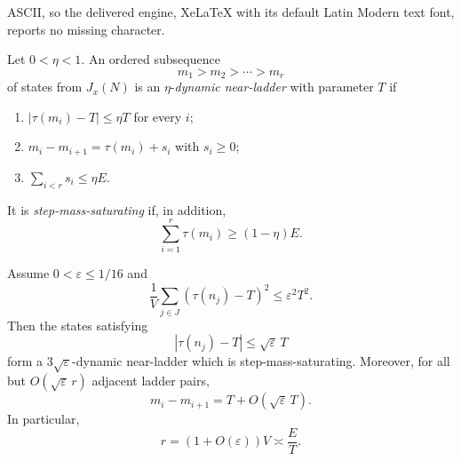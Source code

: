 \documentclass[10pt,a4paper]{amsart}
\begin{document}
ASCII, so the delivered engine, XeLaTeX with its default Latin Modern text font, reports no missing character.
\begin{definition}\label{def:dynamic-ladder}
Let $0<\eta<1$.  An ordered subsequence
\[
 m_1>m_2>\cdots>m_r
\]
of states from $J_x(N)$ is an $\eta$-\emph{dynamic near-ladder} with
parameter $T$ if
\begin{enumerate}[label=\textup{(\roman*)}]
 \item $|\tau(m_i)-T|\leq\eta T$ for every $i$;
 \item $m_i-m_{i+1}=\tau(m_i)+s_i$ with $s_i\geq0$;
 \item $\sum_{i<r}s_i\leq\eta E$.
\end{enumerate}
It is \emph{step-mass-saturating} if, in addition,
\[
 \sum_{i=1}^r\tau(m_i)\geq(1-\eta)E.
\]
\end{definition}

\begin{theorem}
\label{thm:variance-ladder}
Assume $0<\varepsilon\leq1/16$ and
\begin{equation}\label{eq:variance-assumption}
 \frac1V\sum_{j\in J}(\tau(n_j)-T)^2
 \leq\varepsilon^2T^2.
\end{equation}
Then the states satisfying
\[
 |\tau(n_j)-T|\leq\sqrt\varepsilon\,T
\]
form a $3\sqrt\varepsilon$-dynamic near-ladder which is
step-mass-saturating.  Moreover, for all but
$O(\sqrt\varepsilon\,r)$ adjacent ladder pairs,
\begin{equation}\label{eq:ladder-gaps}
 m_i-m_{i+1}=T+O(\sqrt\varepsilon\,T).
\end{equation}
In particular,
\[
 r=(1+O(\varepsilon))V\asymp\frac ET.
\]
\end{theorem}
\end{document}
